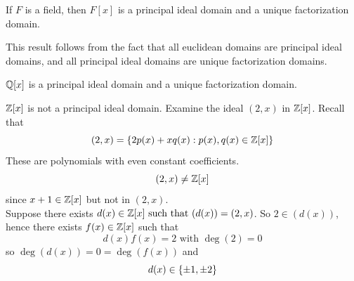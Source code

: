 \begin{corollary}
    If $F$ is a field, then $F[x]$ is a principal ideal domain and a unique factorization domain.
\end{corollary}

This result follows from the fact that all euclidean domains are principal ideal domains, and all principal ideal domains are unique factorization domains.

\begin{example}
    $\mathbb{Q}[x]$ is a principal ideal domain and a unique factorization domain.
\end{example}

\begin{example}
    $\mathbb{Z}[x]$ is not a principal ideal domain. Examine the ideal $(2,x)$ in $\mathbb{Z}[x]$. Recall that 
    $$(2,x) = \left\{2p(x) + xq(x) : p(x),q(x) \in \mathbb{Z}[x]\right\}$$
    These are polynomials with even constant coefficients.
    $$(2,x) \neq \mathbb{Z}[x]$$
    since $x+1 \in \mathbb{Z}[x]$ but not in $(2,x)$. \\
    Suppose there exists $d(x)\in \mathbb{Z}[x] \text{ such that } (d(x)) = (2,x)$. So $2 \in (d(x))$, hence there exists $f(x) \in \mathbb{Z}[x]$ such that 
    $$d(x)f(x) = 2 \text{ with } \deg(2) = 0$$
    so $\deg (d(x)) = 0 = \deg (f(x))$ and 
    $$d(x) \in \left\{\pm 1, \pm 2\right\}$$
\end{example}